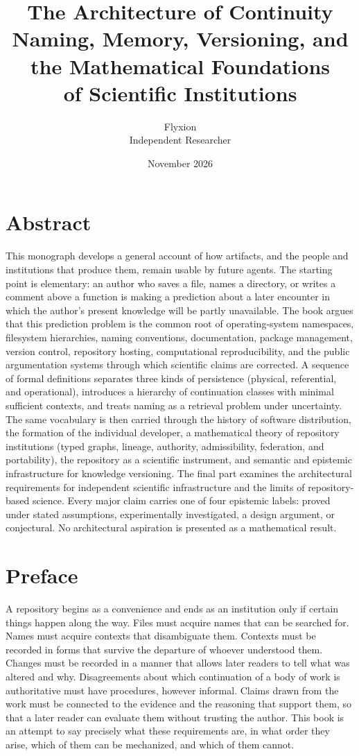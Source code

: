 \documentclass[11pt,twoside,openright]{book}
\title{\textbf{The Architecture of Continuity}\\[0.6em]
\Large Naming, Memory, Versioning, and the Mathematical Foundations\\ of Scientific Institutions}
\author{Flyxion\\[0.3em]\normalsize Independent Researcher}
\date{November 2026}
\theoremstyle{plain}
\theoremstyle{definition}
\theoremstyle{remark}
\begin{document}
\frontmatter
\maketitle

\chapter*{Abstract}
\noindent This monograph develops a general account of how artifacts, and the people and institutions that produce them, remain usable by future agents. The starting point is elementary: an author who saves a file, names a directory, or writes a comment above a function is making a prediction about a later encounter in which the author's present knowledge will be partly unavailable. The book argues that this prediction problem is the common root of operating-system namespaces, filesystem hierarchies, naming conventions, documentation, package management, version control, repository hosting, computational reproducibility, and the public argumentation systems through which scientific claims are corrected. A sequence of formal definitions separates three kinds of persistence (physical, referential, and operational), introduces a hierarchy of continuation classes with minimal sufficient contexts, and treats naming as a retrieval problem under uncertainty. The same vocabulary is then carried through the history of software distribution, the formation of the individual developer, a mathematical theory of repository institutions (typed graphs, lineage, authority, admissibility, federation, and portability), the repository as a scientific instrument, and semantic and epistemic infrastructure for knowledge versioning. The final part examines the architectural requirements for independent scientific infrastructure and the limits of repository-based science. Every major claim carries one of four epistemic labels: proved under stated assumptions, experimentally investigated, a design argument, or conjectural. No architectural aspiration is presented as a mathematical result.


\tableofcontents

\chapter*{Preface}

A repository begins as a convenience and ends as an institution only if certain things happen along the way. Files must acquire names that can be searched for. Names must acquire contexts that disambiguate them. Contexts must be recorded in forms that survive the departure of whoever understood them. Changes must be recorded in a manner that allows later readers to tell what was altered and why. Disagreements about which continuation of a body of work is authoritative must have procedures, however informal. Claims drawn from the work must be connected to the evidence and the reasoning that support them, so that a later reader can evaluate them without trusting the author. This book is an attempt to say precisely what these requirements are, in what order they arise, which of them can be mechanized, and which of them cannot.
\end{document}
